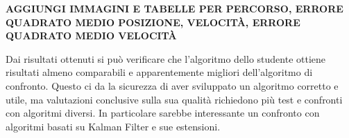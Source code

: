 \textbf{AGGIUNGI IMMAGINI E TABELLE PER PERCORSO, ERRORE QUADRATO MEDIO POSIZIONE, VELOCITÀ, ERRORE QUADRATO MEDIO VELOCITÀ}

Dai risultati ottenuti si può verificare che l'algoritmo dello studente ottiene risultati almeno comparabili e apparentemente migliori dell'algoritmo di confronto.
Questo ci da la sicurezza di aver sviluppato un algoritmo corretto e utile, ma valutazioni conclusive sulla sua qualità richiedono più test e confronti con algoritmi diversi.
In particolare sarebbe interessante un confronto con algoritmi basati su Kalman Filter e sue estensioni. 
